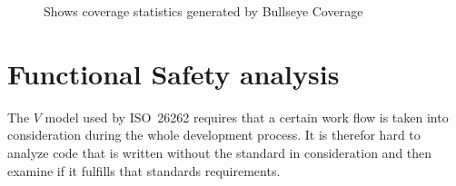 \begin{figure}[!ht]
  \setlength\fboxsep{0pt}
  \setlength\fboxrule{0.5pt}
  \caption{Shows coverage statistics generated by Bullseye Coverage}
  \label{FIG:BULLSEYE}
\end{figure}


\section{Functional Safety analysis}
The $V$ model used by ISO~26262 requires that a certain work flow is
taken into consideration during the whole development process. It is
therefor hard to analyze code that is written without the standard in
consideration and then examine if it fulfills that standards
requirements.

